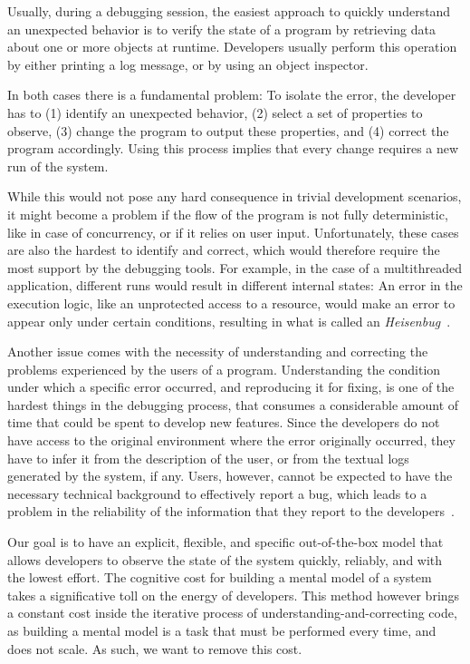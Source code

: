 Usually, during a debugging session, the easiest approach to quickly understand an unexpected behavior is to verify the state of a program by retrieving data about one or more objects at runtime.
Developers usually perform this operation by either printing a log message, or by using an object inspector.

In both cases there is a fundamental problem: To isolate the error, the developer has to (1) identify an unexpected behavior, (2) select a set of properties to observe, (3) change the program to output these properties, and (4) correct the program accordingly.
Using this process implies that every change requires a new run of the system.

While this would not pose any hard consequence in trivial development scenarios, it might become a problem if the flow of the program is not fully deterministic, like in case of concurrency, or if it relies on user input.
Unfortunately, these cases are also the hardest to identify and correct, which would therefore require the most support by the debugging tools.
For example, in the case of a multithreaded application, different runs would result in different internal states: An error in the execution logic, like an unprotected access to a resource, would make an error to appear only under certain conditions, resulting in what is called an \emph{Heisenbug}~\cite{Grot2005}.

Another issue comes with the necessity of understanding and correcting the problems experienced by the users of a program.
Understanding the condition under which a specific error occurred, and reproducing it for fixing, is one of the hardest things in the debugging process, that consumes a considerable amount of time that could be spent to develop new features.
Since the developers do not have access to the original environment where the error originally occurred, they have to infer it from the description of the user, or from the textual logs generated by the system, if any.
Users, however, cannot be expected to have the necessary technical background to effectively report a bug, which leads to a problem in the reliability of the information that they report to the developers~\cite{Zimm2010a}.

Our goal is to have an explicit, flexible, and specific out-of-the-box model that allows developers to observe the state of the system quickly, reliably, and with the lowest effort.
The cognitive cost for building a mental model of a system takes a significative toll on the energy of developers.
This method however brings a constant cost inside the iterative process of understanding-and-correcting code, as building a mental model is a task that must be performed every time, and does not scale.
As such, we want to remove this cost.


